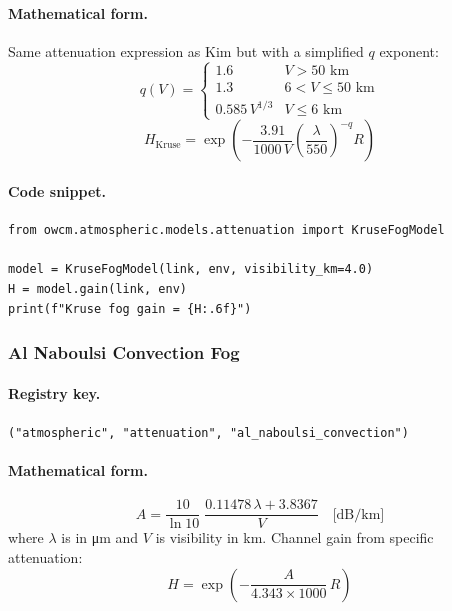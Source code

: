 \documentclass[11pt,a4paper]{article}
\begin{document}
\paragraph{Mathematical form.}
Same attenuation expression as Kim but with a simplified $q$ exponent:
\begin{equation}
q(V) =
\begin{cases}
1.6                 & V > 50\text{ km} \\
1.3                 & 6 < V \le 50\text{ km} \\
0.585\,V^{1/3}      & V \le 6\text{ km}
\end{cases}
\end{equation}
\begin{equation}
\boxed{H_{\text{Kruse}} = \exp\!\left(-\frac{3.91}{1000\,V}\left(\frac{\lambda}{550}\right)^{-q} R\right)}
\end{equation}

\paragraph{Code snippet.}
\begin{lstlisting}
from owcm.atmospheric.models.attenuation import KruseFogModel

model = KruseFogModel(link, env, visibility_km=4.0)
H = model.gain(link, env)
print(f"Kruse fog gain = {H:.6f}")
\end{lstlisting}

\subsubsection{Al Naboulsi Convection Fog}
\label{sec:al_naboulsi_conv}

\paragraph{Registry key.} \texttt{("atmospheric", "attenuation", "al\_naboulsi\_convection")}

\paragraph{Mathematical form.}
\begin{equation}
\boxed{A = \frac{10}{\ln 10}\;\frac{0.11478\,\lambda + 3.8367}{V}
\quad \text{[dB/km]}}
\end{equation}
where $\lambda$ is in \si{\micro m} and $V$ is visibility in km.
Channel gain from specific attenuation:
\begin{equation}
H = \exp\!\left(-\frac{A}{4.343 \times 1000}\,R\right)
\end{equation}
\end{document}
